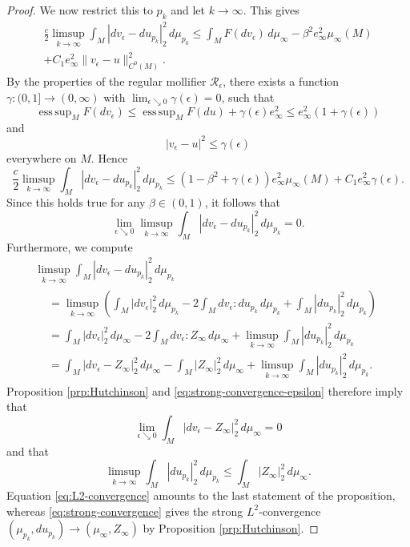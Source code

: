 \documentclass[a4paper]{article}
\DeclareMathOperator*{\esssup}{ess \, sup}
\theoremstyle{definition}
\theoremstyle{remark}
\begin{document}
\begin{proof}
We now restrict this to $p_k$ and let $k \to \infty$. This gives
\begin{multline*}
\frac{c}{2} \limsup_{k \to \infty} \int_M |dv_\epsilon - du_{p_k}|_2^2 \, d\mu_{p_k} \le \int_M F(dv_\epsilon) \, d\mu_\infty - \beta^2 e_\infty^2 \mu_\infty(M) \\
+ C_1 e_\infty^2 \|v_\epsilon - u\|_{C^0(M)}^2.
\end{multline*}
By the properties of the regular mollifier $\mathcal{R}_\epsilon$, there exists a function $\gamma \colon (0, 1] \to (0, \infty)$ with $\lim_{\epsilon \searrow 0} \gamma(\epsilon) = 0$, such that
\[
\esssup_M F(dv_\epsilon) \le \esssup_M F(du) + \gamma(\epsilon) e_\infty^2 \le e_\infty^2 (1 + \gamma(\epsilon))
\]
and
\[
|v_\epsilon - u|^2 \le \gamma(\epsilon)
\]
everywhere on $M$. Hence
\[
\frac{c}{2} \limsup_{k \to \infty} \int_M |dv_\epsilon - du_{p_k}|_2^2 \, d\mu_{p_k} \le  (1 - \beta^2 + \gamma(\epsilon)) e_\infty^2 \mu_\infty(M) + C_1 e_\infty^2 \gamma(\epsilon).
\]
Since this holds true for any $\beta \in (0, 1)$, it follows that
\begin{equation} \label{eq:strong-convergence-epsilon}
\lim_{\epsilon \searrow 0} \limsup_{k \to \infty} \int_M |dv_\epsilon - du_{p_k}|_2^2 \, d\mu_{p_k} = 0.
\end{equation}
Furthermore, we compute
\begin{multline*}
\limsup_{k \to \infty} \int_M |dv_\epsilon - du_{p_k}|_2^2 \, d\mu_{p_k} \\
\begin{aligned}
& = \limsup_{k \to \infty} \left(\int_M |dv_\epsilon|_2^2 \, d\mu_{p_k} - 2 \int_M dv_\epsilon : du_{p_k} \, d\mu_{p_k} + \int_M |du_{p_k}|_2^2 \, d\mu_{p_k}\right) \\
& = \int_M |dv_\epsilon|_2^2 \, d\mu_\infty - 2 \int_M dv_\epsilon : Z_\infty \, d\mu_\infty + \limsup_{k \to \infty} \int_M |du_{p_k}|_2^2 \, d\mu_{p_k} \\
& = \int_M |dv_\epsilon - Z_\infty|_2^2 \, d\mu_\infty - \int_M |Z_\infty|_2^2 \, d\mu_\infty + \limsup_{k \to \infty} \int_M |du_{p_k}|_2^2 \, d\mu_{p_k}.
\end{aligned}
\end{multline*}
Proposition \ref{prp:Hutchinson} and \eqref{eq:strong-convergence-epsilon} therefore imply that
\begin{equation} \label{eq:L2-convergence}
\lim_{\epsilon \searrow 0} \int_M |dv_\epsilon - Z_\infty|_2^2 \, d\mu_\infty = 0
\end{equation}
and that
\begin{equation} \label{eq:strong-convergence}
\limsup_{k \to \infty} \int_M |du_{p_k}|_2^2 \, d\mu_{p_k} \le \int_M |Z_\infty|_2^2 \, d\mu_\infty.
\end{equation}
Equation \eqref{eq:L2-convergence} amounts to the last statement of the proposition, whereas \eqref{eq:strong-convergence} gives the strong $L^2$-convergence $(\mu_{p_k}, du_{p_k}) \to (\mu_\infty, Z_\infty)$
by Proposition \ref{prp:Hutchinson}.


\end{proof}
\end{document}
